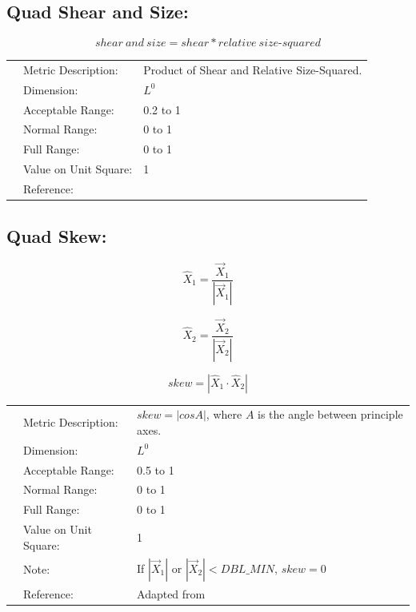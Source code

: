 \documentclass[12pt]{article}
\begin{document}
\subsection*{Quad Shear and Size:}

\begin{displaymath}
shear~and~size = shear * relative~size \textrm{-}squared 
\end{displaymath}

\begin{tabular}{lll}
& Metric Description:  & Product of Shear and Relative Size-Squared.\\ 
& Dimension:           & $L^0$       \\ 
& Acceptable Range:    & 0.2 to 1 \\ 
& Normal Range:        & 0 to 1\\ 
& Full Range:          & 0 to 1\\ 
& Value on Unit Square:& 1 \\
& Reference:           & \cite{four} \\
\end{tabular} 


\subsection*{Quad Skew:}

\begin{displaymath}
\hat X_1 = \frac {\vec X_1} {| \vec X_1 |} 
\end{displaymath}

\begin{displaymath}
\hat X_2 = \frac {\vec X_2} {| \vec X_2 |} 
\end{displaymath}

\begin{displaymath}
skew = | \hat X_1 \cdot \hat X_2 |  
\end{displaymath}

\begin{tabular}{lll}
& Metric Description:  & $skew = |cos A|$, where $A$ is the angle between principle axes.\\
& Dimension:           & $L^0$              \\ 
& Acceptable Range:    & 0.5 to 1              \\ 
& Normal Range:        & 0 to 1\\ 
& Full Range:          & 0 to 1\\ 
& Value on Unit Square:& 1 \\
& Note:                & If $|\vec X_1|$ or $|\vec X_2| < DBL\_MIN$, $skew = 0$  \\
& Reference:           & Adapted from \cite{one} \\
 
\end{tabular} 
\end{document}
